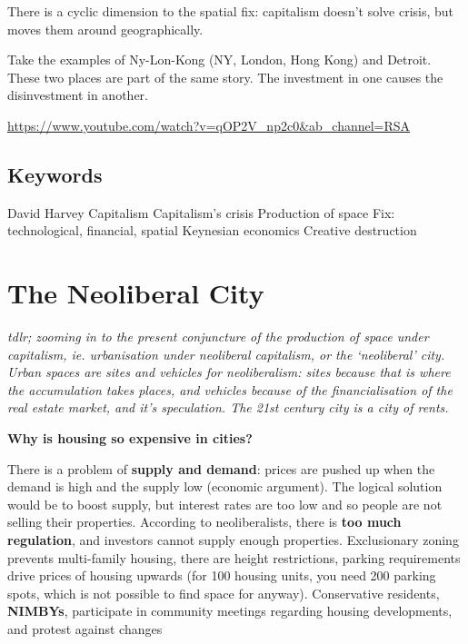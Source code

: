 \documentclass{article}
\begin{document}
There is a cyclic dimension to the spatial fix: capitalism doesn't solve crisis, but moves them around geographically. 

Take the examples of Ny-Lon-Kong (NY, London, Hong Kong) and Detroit. These two places are part of the same story. The investment in one causes the disinvestment in another.

\url{https://www.youtube.com/watch?v=qOP2V_np2c0&ab_channel=RSA}

\subsection{Keywords}

David Harvey
Capitalism
Capitalism's crisis
Production of space
Fix: technological, financial, spatial
Keynesian economics
Creative destruction


\section{The Neoliberal City}

\textit{tdlr; zooming in to the present conjuncture of the production of space under capitalism, ie. urbanisation under neoliberal capitalism, or the `neoliberal' city. Urban spaces are sites and vehicles for neoliberalism: sites because that is where the accumulation takes places, and vehicles because of the financialisation of the real estate market, and it's speculation. The 21st century city is a city of rents.}

\textbf{Why is housing so expensive in cities?} 

\begin{outline}
	\1 There is a problem of \textbf{supply and demand}: prices are pushed up when the demand is high and the supply low (economic argument). The logical solution would be to boost supply, but interest rates are too low and so people are not selling their properties.
	\1 According to neoliberalists, there is \textbf{too much regulation}, and investors cannot supply enough properties. Exclusionary zoning prevents multi-family housing, there are height restrictions, parking requirements drive prices of housing upwards (for 100 housing units, you need 200 parking spots, which is not possible to find space for anyway). 
	\1 Conservative residents, \textbf{NIMBYs}, participate in community meetings regarding housing developments, and protest against changes
\end{outline}
\end{document}

